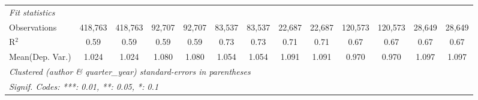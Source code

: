 \begin{tabular}{lcccccccccccc}
   \midrule
   \emph{Fit statistics}\\
   Observations                             & 418,763        & 418,763       & 92,707         & 92,707  & 83,537         & 83,537         & 22,687         & 22,687         & 120,573        & 120,573      & 28,649       & 28,649\\  
   R$^2$                                    & 0.59           & 0.59          & 0.59           & 0.59    & 0.73           & 0.73           & 0.71           & 0.71           & 0.67           & 0.67         & 0.67         & 0.67\\  
Mean(Dep. Var.) & 1.024 & 1.024 & 1.080 & 1.080 & 1.054 & 1.054 & 1.091 & 1.091 & 0.970 & 0.970 & 1.097 & 1.097 \\
   \midrule \midrule
   \multicolumn{13}{l}{\emph{Clustered (author \& quarter\_year) standard-errors in parentheses}}\\
   \multicolumn{13}{l}{\emph{Signif. Codes: ***: 0.01, **: 0.05, *: 0.1}}\\
\end{tabular}
\par\endgroup
